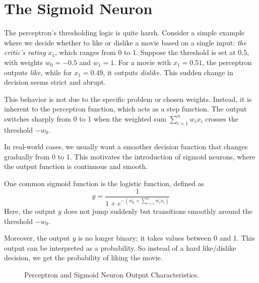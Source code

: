 \section{The Sigmoid Neuron}

The perceptron's thresholding logic is quite harsh. Consider a simple example where we decide whether to like or dislike a movie based on a single input: \textit{the critic's rating} \( x_1 \), which ranges from 0 to 1. Suppose the threshold is set at 0.5, with weights \( w_0 = -0.5 \) and \( w_1 = 1 \). For a movie with \( x_1 = 0.51 \), the perceptron outputs \textit{like,} while for \( x_1 = 0.49 \), it outputs \textit{dislike.} This sudden change in decision seems strict and abrupt.

This behavior is not due to the specific problem or chosen weights. Instead, it is inherent to the perceptron function, which acts as a step function. The output switches sharply from 0 to 1 when the weighted sum
\(
\sum_{i=1}^n w_i x_i
\)
crosses the threshold \(-w_0\).

In real-world cases, we usually want a smoother decision function that changes gradually from 0 to 1. This motivates the introduction of sigmoid neurons, where the output function is continuous and smooth.

One common sigmoid function is the logistic function, defined as
\[
y = \frac{1}{1 + e^{-(w_0 + \sum_{i=1}^n w_i x_i)}}
\]
Here, the output \( y \) does not jump suddenly but transitions smoothly around the threshold \(-w_0\).

Moreover, the output \( y \) is no longer binary; it takes values between 0 and 1. This output can be interpreted as a probability. So instead of a hard like/dislike decision, we get the probability of liking the movie.

\begin{figure}[ht]
    \centering
    \caption{Perceptron and Sigmoid Neuron Output Characteristics.}
    \label{fig:step-sigmoid}
\end{figure}



